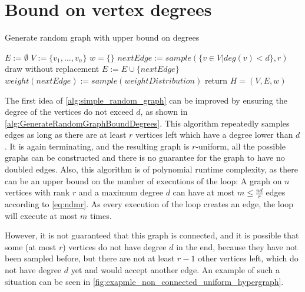 \section{Bound on vertex degrees}
\begin{algorithm}
	\caption{Generate random graph with upper bound on degrees\label{alg:GenerateRandomGraphBoundDegrees}} 
	\begin{algorithmic}
		\State $E := \emptyset$
		\State $V := \{v_1, \ldots, v_n\}$
		\State $w = \{\}$
		\State $nextEdge := sample(\{v\in V| deg(v)< d\}, r) $ \Comment draw without replacement
		\State $E := E \cup \{nextEdge\}$
		\State $weight(nextEdge) := sample(weightDistribution)$ 
		\EndWhile
		\State  return $H = (V, E, w)$
		\EndFunction
	\end{algorithmic}
\end{algorithm}	
The first idea of \cref{alg:simple_random_graph} can be improved by ensuring the degree of the vertices do not exceed $d$, as shown in \cref{alg:GenerateRandomGraphBoundDegrees}. This algorithm repeatedly samples edges as long as there are at least $r$ vertices left which have a degree lower than $d$. It is again terminating,  and the resulting graph is $r$-uniform, all the possible graphs can be constructed and there is no guarantee for the graph to have no doubled edges. Also, this algorithm is of polynomial runtime complexity, as there can be an upper bound on the number of executions of the loop: A graph on $n$ vertices with rank $r$ and a maximum degree $d$ can have at most $m \le \frac{nd}{r}$ edges according to \cref{eq:ndmr}. As every execution of the loop creates an edge, the loop will execute at most $m$ times. 



However, it is not guaranteed that this graph is connected, and it is possible that some (at most $ r$) vertices do not have degree $d$ in the end, because they have not been sampled before, but there are not at least $r-1$ other vertices left, which do not have degree $d$ yet and would accept another edge. An example of such a situation can be seen in \cref{fig:exapmle_non_connected_uniform_hypergraph}.


